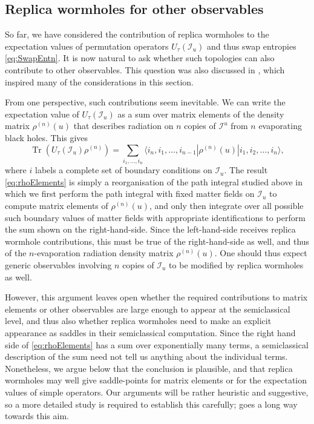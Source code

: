 \documentclass[letterpaper,12pt]{article}
\DeclareMathOperator{\Tr}{Tr}
\newcommand*{\scri}{\mathscr{I}} %
\begin{document}
\subsection{Replica wormholes for other observables}
\label{sec:RWother}

So far, we have considered the contribution of replica wormholes to the expectation values of permutation operators $U_\tau(\scri_u)$ and thus  swap entropies \eqref{eq:SwapEntn}. It is now natural to ask whether such topologies can also contribute to other observables. This question was also discussed in \cite{Stanford:2020wkf}, which inspired many of the considerations in this section.


From one perspective,  such contributions seem inevitable. We can write the expectation value of $U_\tau(\scri_u)$ as a sum over matrix elements of the density matrix $\rho^{(n)}(u)$ that describes radiation on $n$ copies of $\scri^u$ from $n$ evaporating black holes.  This gives
\begin{equation}\label{eq:rhoElements}
	\Tr \left( U_\tau(\scri_u) \rho^{(n)} \right) = \sum_{i_1,\ldots,i_n} \langle i_n,i_1,\ldots,i_{n-1}|\rho^{(n)}(u)|i_1,i_2,\ldots,i_n\rangle,
\end{equation}
where $i$ labels a complete set of boundary conditions on $\scri_u$. The result \eqref{eq:rhoElements} is simply a reorganisation of the path integral studied above in which we first perform the path integral with fixed matter fields on $\scri_u$ to compute matrix elements of $\rho^{(n)}(u)$, and only then integrate over all possible such boundary values of matter fields with appropriate identifications to perform the sum shown on the right-hand-side. Since the left-hand-side receives replica wormhole contributions, this must be true of the right-hand-side as well, and thus of the $n$-evaporation radiation density matrix $\rho^{(n)}(u)$. One should thus expect generic observables involving $n$ copies of $\scri_u$ to be modified by replica wormholes as well.

However, this argument leaves open whether the required contributions to matrix elements or other observables are large enough to appear at the semiclassical level, and thus also whether replica wormholes need to make an explicit appearance as saddles in their semiclassical computation.
Since the right hand side of \eqref{eq:rhoElements} has a sum over exponentially many terms, a semiclassical description of the sum need not tell us anything about the individual terms.  Nonetheless, we argue below that the conclusion is plausible, and that replica wormholes may well give saddle-points for matrix elements or for the expectation values of simple operators. Our arguments will be rather heuristic and suggestive, so a more detailed study is required to establish this carefully; \cite{Stanford:2020wkf} goes a long way towards this aim.
\end{document}
